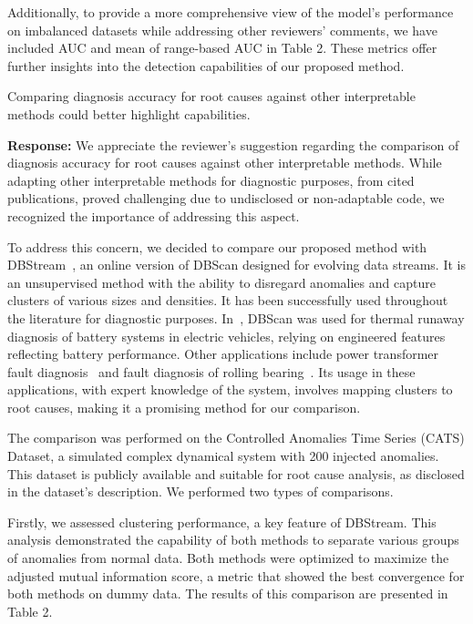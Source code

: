 \documentclass{article}
\makeatletter
\newenvironment{comment}{
\begin{sloppypar}\slshape
\vspace{5 mm}
\color{blue}
 \@beginparpenalty\@M
  \begin{list}{}{\setlength{\topsep}{0ex}%
  \setlength{\leftmargin}{\rightmargin}}\item[]
 \@beginparpenalty\@endparpenalty
}
{\end{list}
\end{sloppypar}
}
\makeatother
\begin{document}
\begin{enumerate}
        Additionally, to provide a more comprehensive view of the model's performance on imbalanced datasets while addressing other reviewers' comments, we have included AUC and mean of range-based AUC in Table 2. These metrics offer further insights into the detection capabilities of our proposed method.
  \item
        \begin{comment}
        Comparing diagnosis accuracy for root causes against other interpretable methods could better highlight capabilities.
        \end{comment}
        {\bf Response:}
        We appreciate the reviewer's suggestion regarding the comparison of diagnosis accuracy for root causes against other interpretable methods. While adapting other interpretable methods for diagnostic purposes, from cited publications, proved challenging due to undisclosed or non-adaptable code, we recognized the importance of addressing this aspect.

        To address this concern, we decided to compare our proposed method with DBStream~\cite{Hahsler2016}, an online version of DBScan designed for evolving data streams. It is an unsupervised method with the ability to disregard anomalies and capture clusters of various sizes and densities. It has been successfully used throughout the literature for diagnostic purposes. In~\cite{Li2019}, DBScan was used for thermal runaway diagnosis of battery systems in electric vehicles, relying on engineered features reflecting battery performance. Other applications include power transformer fault diagnosis~\cite{Liu2020} and fault diagnosis of rolling bearing~\cite{Li2020}.
        Its usage in these applications, with expert knowledge of the system, involves mapping clusters to root causes, making it a promising method for our comparison.

        The comparison was performed on the Controlled Anomalies Time Series (CATS) Dataset, a simulated complex dynamical system with 200 injected anomalies. This dataset is publicly available and suitable for root cause analysis, as disclosed in the dataset's description. We performed two types of comparisons.

        Firstly, we assessed clustering performance, a key feature of DBStream. This analysis demonstrated the capability of both methods to separate various groups of anomalies from normal data. Both methods were optimized to maximize the adjusted mutual information score, a metric that showed the best convergence for both methods on dummy data. The results of this comparison are presented in Table 2.


\end{enumerate}
\end{document}
